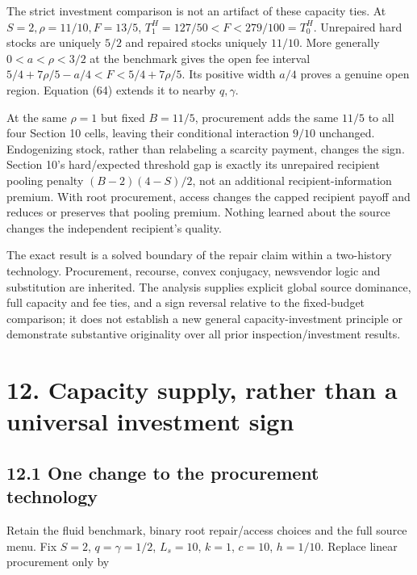 \documentclass[
  11pt,
  a4paper,
]{article}
\begin{document}
The strict investment comparison is not an artifact of these capacity
ties. At \(S=2,\rho=11/10,F=13/5\), \(T^H_1=127/50<F<279/100=T^H_0\).
Unrepaired hard stocks are uniquely \(5/2\) and repaired stocks uniquely
\(11/10\). More generally \(0<a<\rho<3/2\) at the benchmark gives the
open fee interval \(5/4+7\rho/5-a/4<F<5/4+7\rho/5\). Its positive width
\(a/4\) proves a genuine open region. Equation (64) extends it to nearby
\(q,\gamma\).

At the same \(\rho=1\) but fixed \(B=11/5\), procurement adds the same
\(11/5\) to all four Section 10 cells, leaving their conditional
interaction \(9/10\) unchanged. Endogenizing stock, rather than
relabeling a scarcity payment, changes the sign. Section 10's
hard/expected threshold gap is exactly its unrepaired recipient pooling
penalty \((B-2)(4-S)/2\), not an additional recipient-information
premium. With root procurement, access changes the capped recipient
payoff and reduces or preserves that pooling premium. Nothing learned
about the source changes the independent recipient's quality.

The exact result is a solved boundary of the repair claim within a
two-history technology. Procurement, recourse, convex conjugacy,
newsvendor logic and substitution are inherited. The analysis supplies
explicit global source dominance, full capacity and fee ties, and a sign
reversal relative to the fixed-budget comparison; it does not establish
a new general capacity-investment principle or demonstrate substantive
originality over all prior inspection/investment results.

\hypertarget{capacity-supply-rather-than-a-universal-investment-sign}{%
\section{12. Capacity supply, rather than a universal investment
sign}\label{capacity-supply-rather-than-a-universal-investment-sign}}

\hypertarget{one-change-to-the-procurement-technology}{%
\subsection{12.1 One change to the procurement
technology}\label{one-change-to-the-procurement-technology}}

Retain the fluid benchmark, binary root repair/access choices and the
full source menu. Fix \(S=2\), \(q=\gamma=1/2\), \(L_s=10\), \(k=1\),
\(c=10\), \(h=1/10\). Replace linear procurement only by
\end{document}
